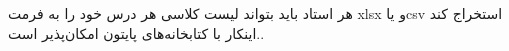 هر استاد باید بتواند لیست کلاسی هر درس خود را به فرمت xlsx و یاcsv استخراج کند .اینکار با کتابخانه‌های پایتون امکان‌پذیر است.